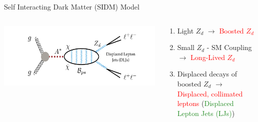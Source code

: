 \documentclass{beamer}
\begin{document}
\begin{frame}{Self Interacting Dark Matter (SIDM) Model }
\vspace{-0.2cm}
\begin{columns}
\begin{column}{.2\textwidth}
\begin{center}
    \includegraphics[width =3.5 cm, height = 2.5 cm]{FeyDia.jpg}\\
\end{center}
\end{column}
\hspace{.5cm}
\begin{column}{.7\textwidth}
\begin{tcolorbox}[colback=uvaorange!5!white,colframe=uvaorange]
\begin{enumerate}
    \item Light \textbf{$Z_d$} $\rightarrow$ \textcolor{red}{Boosted $Z_d$}
       \item Small $Z_d$ - SM Coupling \\ $\rightarrow$ \textcolor{red}{Long-Lived $Z_d$}
       \item Displaced decays of boosted $Z_d$ $\rightarrow$ \textcolor{red}{Displaced, collimated leptons }(\textcolor{forestgreen}{Displaced Lepton Jets (LJs)})
\end{enumerate}
   
\end{tcolorbox}
\end{column}
\end{columns}


\begin{columns}


\end{columns}
\end{frame}
\end{document}
